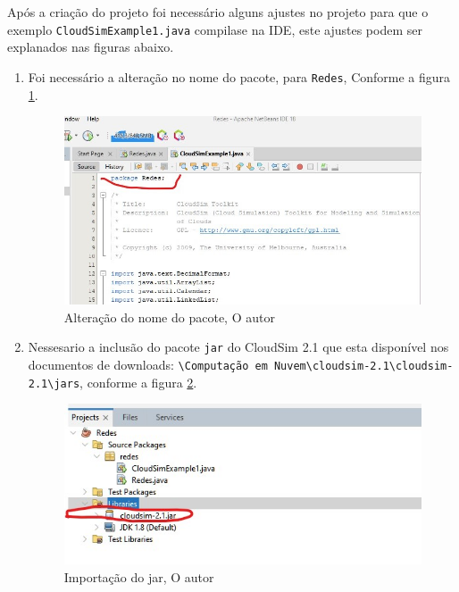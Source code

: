 \par Após a criação do projeto foi necessário alguns ajustes no projeto para que o exemplo \verb#CloudSimExample1.java# compilase na IDE, este ajustes podem ser explanados nas figuras abaixo.

\begin{enumerate}[label=\Roman{*}, ref=(\roman{*})]
  \item Foi necessário a alteração no nome do pacote, para \verb#Redes#, Conforme a figura \ref{fig:rename_pacote}. \newline
  \begin{figure}[h]
    \center
    \includegraphics[scale=.5]{figure/rename_pacote.jpg}
    \caption{Alteração do nome do pacote, O autor}
    \label{fig:rename_pacote}
  \end{figure}

  \item Nessesario a inclusão do pacote \verb#jar# do CloudSim 2.1 que esta disponível nos documentos de downloads: \verb#\Computação em Nuvem\cloudsim-2.1\cloudsim-2.1\jars#, conforme a figura \ref{fig:import_jar}. \newline
  \begin{figure}[h]
    \center
    \includegraphics[scale=.8]{figure/import_jar.jpg}
    \caption{Importação do jar, O autor}
    \label{fig:import_jar}
  \end{figure}
\end{enumerate}


